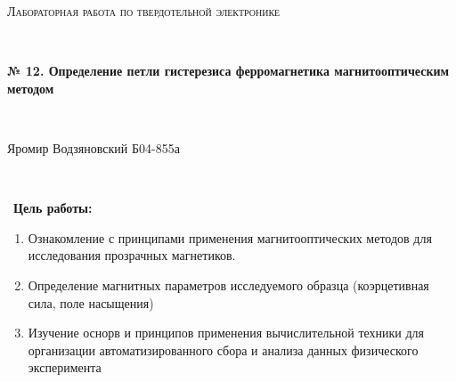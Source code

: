 \documentclass[a4paper]{article}
\begin{document}
\graphicspath{ {pictures/} }
\begin{center}
    {\scshape\Large Лабораторная работа по твердотельной электронике} \par

    \

    {\huge\bfseries № 12. Определение петли гистерезиса ферромагнетика магнитооптическим методом} \par 

    \

    {\large Яромир Водзяновский Б04-855а}
\end{center}

\

\
\textbf{Цель работы:} \par 
\begin{enumerate}
    \item Ознакомление с принципами применения магнитооптических методов для исследования прозрачных магнетиков. 
    \item Определение магнитных параметров исследуемого образца (коэрцетивная сила, поле насыщения)
    \item Изучение оснорв и принципов применения вычислительной техники для организации  автоматизированного сбора и анализа данных физического эксперимента
\end{enumerate}
\end{document}
